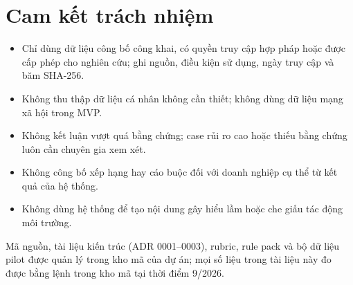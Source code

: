 \documentclass[11pt,a4paper]{article}
\begin{document}
\section{Cam kết trách nhiệm}

\begin{itemize}
  \item Chỉ dùng dữ liệu công bố công khai, có quyền truy cập hợp pháp hoặc được cấp phép cho nghiên cứu; ghi nguồn, điều kiện sử dụng, ngày truy cập và băm SHA-256.
  \item Không thu thập dữ liệu cá nhân không cần thiết; không dùng dữ liệu mạng xã hội trong MVP.
  \item Không kết luận vượt quá bằng chứng; case rủi ro cao hoặc thiếu bằng chứng luôn cần chuyên gia xem xét.
  \item Không công bố xếp hạng hay cáo buộc đối với doanh nghiệp cụ thể từ kết quả của hệ thống.
  \item Không dùng hệ thống để tạo nội dung gây hiểu lầm hoặc che giấu tác động môi trường.
\end{itemize}

\vspace{6pt}
\begin{center}\small\color{gsgray}
Mã nguồn, tài liệu kiến trúc (ADR 0001--0003), rubric, rule pack và bộ dữ liệu pilot được quản lý trong kho mã của dự án; mọi số liệu trong tài liệu này đo được bằng lệnh trong kho mã tại thời điểm 9/2026.
\end{center}
\end{document}
